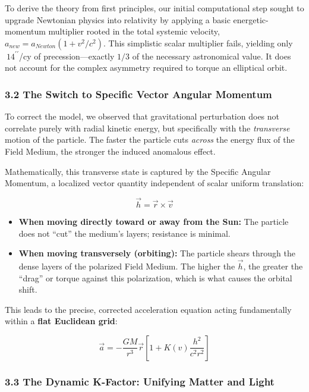 \documentclass[
]{article}
\providecommand{\tightlist}{%
  \setlength{\itemsep}{0pt}\setlength{\parskip}{0pt}}
\begin{document}
To derive the theory from first principles, our initial computational
step sought to upgrade Newtonian physics into relativity by applying a
basic energetic-momentum multiplier rooted in the total systemic
velocity, \(a_{new} = a_{Newton}(1 + v^2/c^2)\). This simplistic scalar
multiplier fails, yielding only \(~14^{\prime\prime}\)/cy of
precession---exactly \(1/3\) of the necessary astronomical value. It
does not account for the complex asymmetry required to torque an
elliptical orbit.

\subsubsection{3.2 The Switch to Specific Vector Angular
Momentum}\label{the-switch-to-specific-vector-angular-momentum}

To correct the model, we observed that gravitational perturbation does
not correlate purely with radial kinetic energy, but specifically with
the \emph{transverse} motion of the particle. The faster the particle
cuts \emph{across} the energy flux of the Field Medium, the stronger the
induced anomalous effect.

Mathematically, this transverse state is captured by the Specific
Angular Momentum, a localized vector quantity independent of scalar
uniform translation:

\[ \vec{h} = \vec{r} \times \vec{v} \]

\begin{itemize}
\tightlist
\item
  \textbf{When moving directly toward or away from the Sun:} The
  particle does not ``cut'' the medium's layers; resistance is minimal.
\item
  \textbf{When moving transversely (orbiting):} The particle shears
  through the dense layers of the polarized Field Medium. The higher the
  \(\vec{h}\), the greater the ``drag'' or torque against this
  polarization, which is what causes the orbital shift.
\end{itemize}

This leads to the precise, corrected acceleration equation acting
fundamentally within a \textbf{flat Euclidean grid}:

\[ \vec{a} = -\frac{GM}{r^3}\vec{r} \left[ 1 + K(v) \frac{h^2}{c^2 r^2} \right] \]

\subsubsection{3.3 The Dynamic K-Factor: Unifying Matter and
Light}\label{the-dynamic-k-factor-unifying-matter-and-light}
\end{document}
